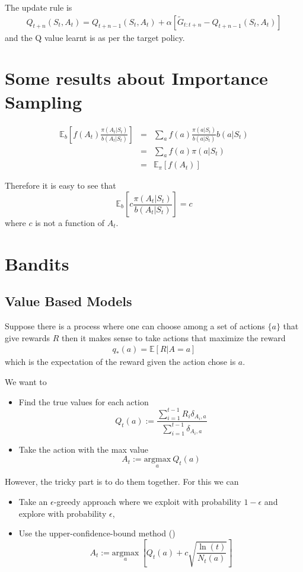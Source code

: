 \documentclass[11pt,a4paper]{article}
\newcommand\be{\begin{equation}}
\newcommand\bea{\begin{eqnarray}}
\newcommand\ee{\end{equation}}
\newcommand\eea{\end{eqnarray}}
\newcommand{\nn}{\nonumber \\}
\newcommand{\todo}[1]{{\color{cyan}{TODO: #1}}}
\begin{document}
The update rule is
\bea
Q_{t+n}(S_t,A_t) =Q_{t+n-1}(S_t,A_t)  + \alpha [ \tilde  G_{t:t+n} - Q_{t+n-1} (S_t,A_t)]
\eea
and the Q value learnt is as per the target policy.

\section{Some results about Importance Sampling}

\bea
\mathbb E_b [ f(A_t) \frac{\pi(A_t|S_t)}{b(A_t|S_t)}] &=& \sum_a f(a) \frac{\pi(a|S_t)}{b(a|S_t)} b(a|S_t) \nn
&=& \sum_a f(a) \pi(a|S_t) \nn
&=& \mathbb E_\pi[ f(A_t)]
\eea

Therefore it is easy to see that
\be
\mathbb E_b[ c  \frac{\pi(A_t|S_t)}{b(A_t|S_t)}] = c
\ee
where $c$ is not a function of $A_t$.

\section{Bandits}

\subsection{Value Based Models}

Suppose there is a process where one can choose among a set of actions $\{a\}$ that give rewards $R$ then it makes sense to take actions that maximize the reward
\bea
q_*(a) = \mathbb E[R|A=a]
\eea
which is the expectation of the reward given the action chose is $a$.

We want to 
\begin{itemize}
\item Find the true values for each action
\be
Q_t(a) := \frac{\sum_{i=1}^{t-1} R_i \delta_{A_i,a}}{\sum_{i=1}^{t-1}  \delta_{A_i,a}} \label{rewardrunningmean}
\ee
\item Take the action with the max value
\be
A_t := \underset{a}{\text{argmax}} ~ Q_t(a)
\ee
\end{itemize}

However, the tricky part is to do them together. For this we can 
\begin{itemize}
\item Take an $\epsilon$-greedy approach where we exploit with probability $1-\epsilon$ and explore with probability $\epsilon$,
\item Use the upper-confidence-bound method (\todo{find the math behind this})
\be
A_t := \underset{a}{\text{argmax}} ~ \left[ Q_t(a) + c \sqrt{\frac{\ln(t)}{N_t(a)}}\right]
\ee
\end{itemize}
\end{document}
